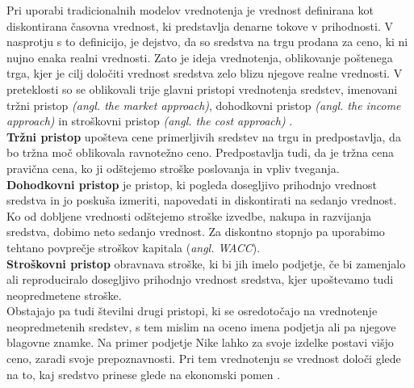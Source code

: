\documentclass[12pt, a4paper]{amsart}
\theoremstyle{definition} %
\theoremstyle{plain} %
\begin{document}
Pri uporabi tradicionalnih modelov vrednotenja je vrednost definirana kot diskontirana časovna vrednost, ki predstavlja denarne tokove v prihodnosti. V nasprotju s to definicijo, je dejstvo, da so sredstva na trgu prodana za ceno, ki ni nujno enaka realni vrednosti. Zato je ideja vrednotenja, oblikovanje poštenega trga, kjer je cilj določiti vrednost sredstva zelo blizu njegove realne vrednosti. V preteklosti so se oblikovali trije glavni pristopi vrednotenja sredstev, imenovani tržni pristop \textit{(angl. the market approach)}, dohodkovni pristop \textit{(angl. the income approach)} in stroškovni pristop \textit{(angl. the cost approach)} \cite[str. 63]{Mun}.\\

\textbf{Tržni pristop} upošteva cene primerljivih sredstev na trgu in predpostavlja, da bo tržna moč oblikovala ravnotežno ceno. Predpostavlja tudi, da je tržna cena pravična cena, ko ji odštejemo stroške poslovanja in vpliv tveganja. \\

\textbf{Dohodkovni pristop} je pristop, ki pogleda dosegljivo prihodnjo vrednost sredstva in jo poskuša izmeriti, napovedati in diskontirati na sedanjo vrednost. Ko od dobljene vrednosti odštejemo stroške izvedbe, nakupa in razvijanja sredstva, dobimo neto sedanjo vrednost. Za diskontno stopnjo pa uporabimo tehtano povprečje stroškov kapitala (\textit{angl. WACC}).\\

\textbf{Stroškovni pristop} obravnava stroške, ki bi jih imelo podjetje, če bi zamenjalo ali reproduciralo dosegljivo prihodnjo vrednost sredstva, kjer upoštevamo tudi neopredmetene stroške.\\

Obstajajo pa tudi številni drugi pristopi, ki se osredotočajo na vrednotenje neopredmetenih sredstev, s tem mislim na oceno imena podjetja ali pa njegove blagovne znamke. Na primer podjetje Nike lahko za svoje izdelke postavi višjo ceno, zaradi svoje prepoznavnosti. Pri tem vrednotenju se vrednost določi glede na to, kaj sredstvo prinese glede na ekonomski pomen \cite[str. 64, 65]{Mun}. \\
\end{document}
